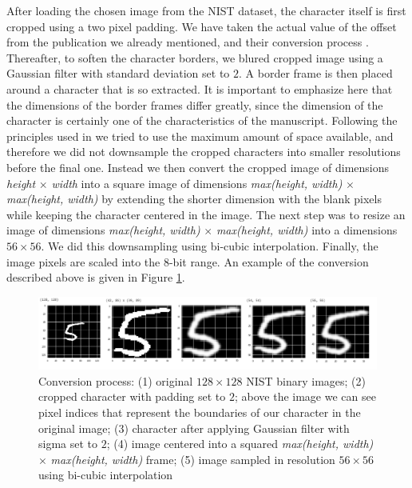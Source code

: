 \documentclass[eng]{simposium}
\begin{document}
After loading the chosen image from the NIST dataset, the character itself is first cropped using a two pixel padding. 
We have taken the actual value of the offset from the publication we already mentioned, and their conversion process \cite{1}. 
Thereafter, to soften the character borders, we blured cropped image using a Gaussian filter with standard deviation set to $2$. 
A border frame is then placed around a character that is so extracted. 
It is important to emphasize here that the dimensions of the border frames differ greatly, since the dimension of the 
character is certainly one of the characteristics of the manuscript. 
Following the principles used in \cite{1} we tried to use the maximum amount of space available, and 
therefore we did not downsample the cropped characters into smaller resolutions before the final one. 
Instead we then convert the cropped image of dimensions \textit{height} $\times$ \textit{width} into a square image of dimensions 
\textit{max(height, width)} $\times$ \textit{max(height, width)} by extending the shorter dimension with the blank pixels 
while keeping the character centered in the image. 
The next step was to resize an image of dimensions \textit{max(height, width)} $\times$ \textit{max(height, width)} into a 
dimensions $56 \times 56$.
We did this downsampling using bi-cubic interpolation. 
Finally, the image pixels are scaled into the 8-bit range. 
An example of the conversion described above is given in Figure \ref{fig:conversion}. 

\begin{figure}[!ht]
  \centering
  \includegraphics[width=1\textwidth]{conversion.png}
  \caption{Conversion process: 
  (1) original $128 \times 128$ NIST binary images; 
  (2) cropped character with padding set to $2$; above the image we can see pixel indices that represent the boundaries of our character in the original image; 
  (3) character after applying Gaussian filter with sigma set to $2$; 
  (4) image centered into a squared \textit{max(height, width)} $\times$ \textit{max(height, width)} frame; 
  (5) image sampled in resolution $56 \times 56$ using bi-cubic interpolation}
  \label{fig:conversion}
\end{figure}
\end{document}
